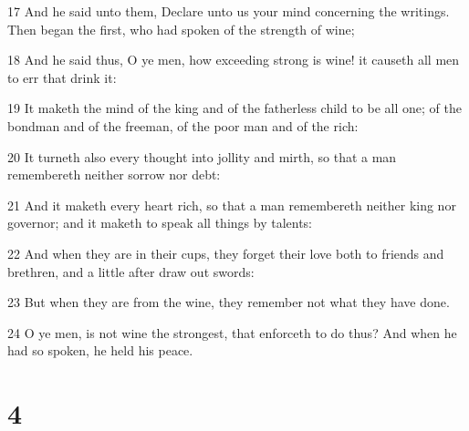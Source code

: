 \par 17 And he said unto them, Declare unto us your mind concerning the writings. Then began the first, who had spoken of the strength of wine;
\par 18 And he said thus, O ye men, how exceeding strong is wine! it causeth all men to err that drink it:
\par 19 It maketh the mind of the king and of the fatherless child to be all one; of the bondman and of the freeman, of the poor man and of the rich:
\par 20 It turneth also every thought into jollity and mirth, so that a man remembereth neither sorrow nor debt:
\par 21 And it maketh every heart rich, so that a man remembereth neither king nor governor; and it maketh to speak all things by talents:
\par 22 And when they are in their cups, they forget their love both to friends and brethren, and a little after draw out swords:
\par 23 But when they are from the wine, they remember not what they have done.
\par 24 O ye men, is not wine the strongest, that enforceth to do thus? And when he had so spoken, he held his peace.

\chapter{4}


